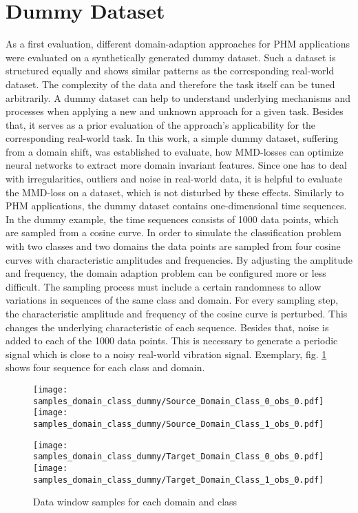 \section{Dummy Dataset}
As a first evaluation, different domain-adaption approaches for PHM applications were evaluated on a synthetically generated dummy dataset. Such a dataset is structured equally and shows similar patterns as the corresponding real-world dataset. The complexity of the data and therefore the task itself can be tuned arbitrarily. A dummy dataset can help to understand underlying mechanisms and processes when applying a new and unknown approach for a given task. Besides that, it serves as a prior evaluation of the approach's applicability for the corresponding real-world task. In this work, a simple dummy dataset, suffering from a domain shift, was established to evaluate, how MMD-losses can optimize neural networks to extract more domain invariant features. Since one has to deal with irregularities, outliers and noise in real-world data, it is helpful to evaluate the MMD-loss on a dataset, which is not disturbed by these effects. Similarly to PHM applications, the dummy dataset contains one-dimensional time sequences. In the dummy example, the time sequences consists of 1000 data points, which are sampled from a cosine curve. In order to simulate the classification problem with two classes and two domains the data points are sampled from four cosine curves with characteristic amplitudes and frequencies. By adjusting the amplitude and frequency, the domain adaption problem can be configured more or less difficult. The sampling process must include a certain randomness to allow variations in sequences of the same class and domain. For every sampling step, the characteristic amplitude and frequency of the cosine curve is perturbed. This changes the underlying characteristic of each sequence. Besides that, noise is added to each of the 1000 data points. This is necessary to generate a periodic signal which is close to a noisy real-world vibration signal. Exemplary, fig. \ref{fig:samples_domain_class_dummy} shows four sequence for each class and domain. 

\begin{figure}[H]
  \centering
  \texttt{[image: samples\_domain\_class\_dummy/Source\_Domain\_Class\_0\_obs\_0.pdf]}
  \hspace{.3cm}
  \texttt{[image: samples\_domain\_class\_dummy/Source\_Domain\_Class\_1\_obs\_0.pdf]}

  \vspace{.3cm}

  \texttt{[image: samples\_domain\_class\_dummy/Target\_Domain\_Class\_0\_obs\_0.pdf]}
  \hspace{.3cm}
  \texttt{[image: samples\_domain\_class\_dummy/Target\_Domain\_Class\_1\_obs\_0.pdf]}

  \caption{Data window samples for each domain and class}
  \label{fig:samples_domain_class_dummy}
\end{figure}

